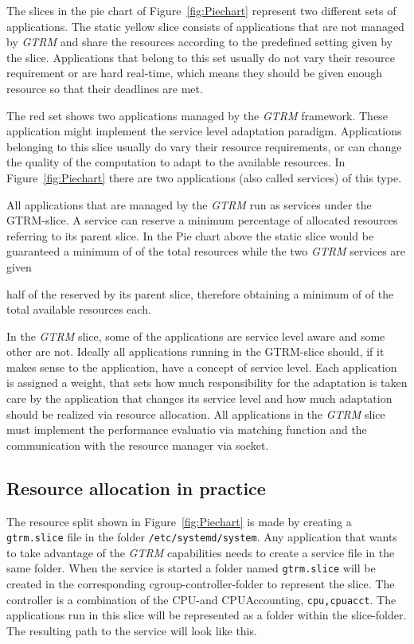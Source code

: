 \documentclass[nobiblatex]{LTHthesis}
\begin{document}
The slices in the pie chart of Figure~\ref{fig:Piechart} represent two
different sets of applications. The static yellow slice consists of
applications that are not managed by \emph{GTRM} and share the resources
according to the predefined setting given by the slice. Applications
that belong to this set usually do not vary their resource requirement
or are hard real-time, which means they should be given enough resource
so that their deadlines are met. 

The red set shows two applications managed by the \emph{GTRM} framework. These
application might implement the service level adaptation paradigm.
Applications belonging to this slice usually do vary their resource
requirements, or can change the quality of the computation to adapt to the
available resources. In Figure~\ref{fig:Piechart} there are two applications
(also called services) of this type.

All applications that are managed by the \emph{GTRM} run as services under the 
GTRM-slice. A service can reserve a minimum percentage of allocated 
resources referring to its parent slice.
In the Pie chart above the static slice would be guaranteed a minimum of 
 of the total resources while the two \emph{GTRM} services are given 

half of the  reserved by its parent slice, therefore obtaining
a minimum of  of the total available resources each.

In the \emph{GTRM} slice, some of the applications are service level aware and some
other are not. Ideally all applications running in the GTRM-slice should, 
if it makes sense to the application, have a concept of service level.
Each application is assigned a weight, that sets how much responsibility
for the adaptation is taken care by the application that changes its service
level and how much adaptation should be realized via resource allocation.
All applications in the \emph{GTRM} slice must implement the performance evaluatio
via matching function and the communication with the resource manager via
socket.

\subsection{Resource allocation in practice}
The resource split shown in Figure~\ref{fig:Piechart} is made by creating 
a \texttt{gtrm.slice} file in the folder \texttt{/etc/systemd/system}.
Any application that wants to take advantage of the \emph{GTRM} capabilities needs
to create a service file in the same folder. When the service is started a folder named \texttt{gtrm.slice} will be created in the corresponding cgroup-controller-folder to represent the slice. The controller is a combination of the CPU-and CPUAccounting, \texttt{cpu,cpuacct}. The applications run in this slice will be represented as a folder within the slice-folder. The resulting path to the service will look like this.
\end{document}

